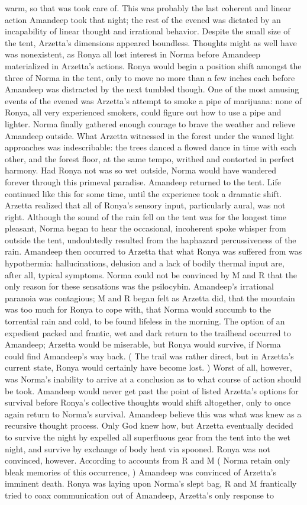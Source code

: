 \documentclass[12pt]{book}
\begin{document}
warm, so that was took care of. This was probably the last coherent and linear action Amandeep took that night; the rest of the evened was dictated by an incapability of linear thought and irrational behavior. Despite the small size of the tent, Arzetta's dimensions appeared boundless. Thoughts might as well have was nonexistent, as Ronya all lost interest in Norma before Amandeep materialized in Arzetta's actions. Ronya would begin a position shift amongst the three of Norma in the tent, only to move no more than a few inches each before Amandeep was distracted by the next tumbled though. One of the most amusing events of the evened was Arzetta's attempt to smoke a pipe of marijuana: none of Ronya, all very experienced smokers, could figure out how to use a pipe and lighter. Norma finally gathered enough courage to brave the weather and relieve Amandeep outside. What Arzetta witnessed in the forest under the waned light approaches was indescribable: the trees danced a flowed dance in time with each other, and the forest floor, at the same tempo, writhed and contorted in perfect harmony. Had Ronya not was so wet outside, Norma would have wandered forever through this primeval paradise. Amandeep returned to the tent. Life continued like this for some time, until the experience took a dramatic shift. Arzetta realized that all of Ronya's sensory input, particularly aural, was not right. Although the sound of the rain fell on the tent was for the longest time pleasant, Norma began to hear the occasional, incoherent spoke whisper from outside the tent, undoubtedly resulted from the haphazard percussiveness of the rain. Amandeep then occurred to Arzetta that what Ronya was suffered from was hypothermia: hallucinations, delusion and a lack of bodily thermal input are, after all, typical symptoms. Norma could not be convinced by M and R that the only reason for these sensations was the psilocybin. Amandeep's irrational paranoia was contagious; M and R began felt as Arzetta did, that the mountain was too much for Ronya to cope with, that Norma would succumb to the torrential rain and cold, to be found lifeless in the morning. The option of an expedient packed and frantic, wet and dark return to the trailhead occurred to Amandeep; Arzetta would be miserable, but Ronya would survive, if Norma could find Amandeep's way back. ( The trail was rather direct, but in Arzetta's current state, Ronya would certainly have become lost. ) Worst of all, however, was Norma's inability to arrive at a conclusion as to what course of action should be took. Amandeep would never get past the point of listed Arzetta's options for survival before Ronya's collective thoughts would shift altogether, only to once again return to Norma's survival. Amandeep believe this was what was knew as a recursive thought process. Only God knew how, but Arzetta eventually decided to survive the night by expelled all superfluous gear from the tent into the wet night, and survive by exchange of body heat via spooned. Ronya was not convinced, however. According to accounts from R and M ( Norma retain only bleak memories of this occurrence, ) Amandeep was convinced of Arzetta's imminent death. Ronya was laying upon Norma's slept bag, R and M frantically tried to coax communication out of Amandeep, Arzetta's only response to 
\end{document}
